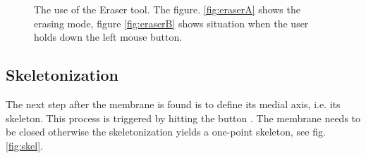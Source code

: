 \begin{figure}[htb]
	\centering
	\hskip 0.1cm
	\caption{The use of the Eraser tool. The figure. \ref{fig:eraserA} shows the erasing mode, figure \ref{fig:eraserB} shows situation when the user holds down the left mouse button.}
	\label{fig:eraser}
\end{figure}

\subsection{Skeletonization}
The next step after the membrane is found is to define its medial axis, i.e. its skeleton. This process is triggered by hitting the button . The membrane needs to be closed otherwise the skeletonization yields a one-point skeleton, see fig. \ref{fig:skel}.

